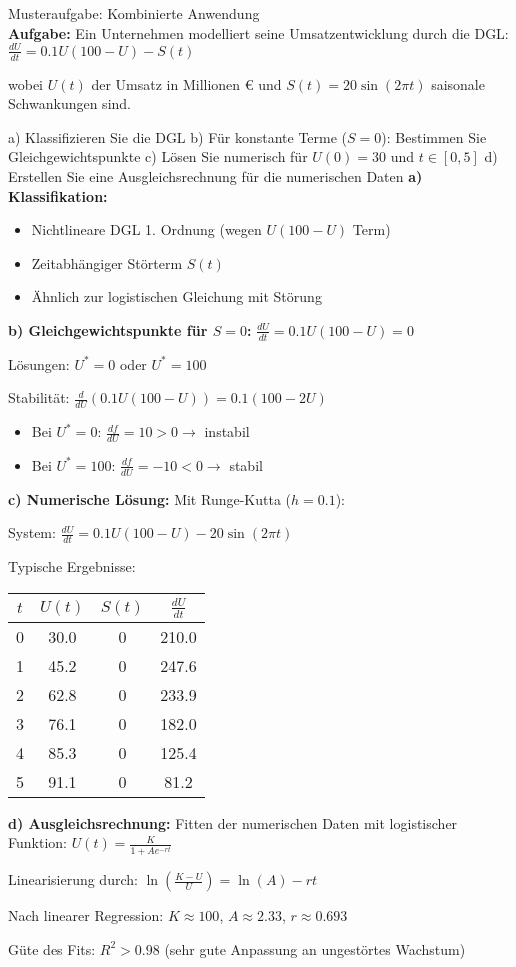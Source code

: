 \begin{example2}{Musteraufgabe: Kombinierte Anwendung}\\
\textbf{Aufgabe:} Ein Unternehmen modelliert seine Umsatzentwicklung durch die DGL:
$\frac{dU}{dt} = 0.1U(100 - U) - S(t)$

wobei $U(t)$ der Umsatz in Millionen € und $S(t) = 20\sin(2\pi t)$ saisonale Schwankungen sind.

a) Klassifizieren Sie die DGL
b) Für konstante Terme ($S = 0$): Bestimmen Sie Gleichgewichtspunkte
c) Lösen Sie numerisch für $U(0) = 30$ und $t \in [0, 5]$
d) Erstellen Sie eine Ausgleichsrechnung für die numerischen Daten
\tcblower
\textbf{a) Klassifikation:}
\begin{itemize}
    \item Nichtlineare DGL 1. Ordnung (wegen $U(100-U)$ Term)
    \item Zeitabhängiger Störterm $S(t)$
    \item Ähnlich zur logistischen Gleichung mit Störung
\end{itemize}

\textbf{b) Gleichgewichtspunkte für $S = 0$:}
$\frac{dU}{dt} = 0.1U(100 - U) = 0$

Lösungen: $U^* = 0$ oder $U^* = 100$

Stabilität:
$\frac{d}{dU}\left(0.1U(100-U)\right) = 0.1(100 - 2U)$

\begin{itemize}
    \item Bei $U^* = 0$: $\frac{df}{dU} = 10 > 0 \rightarrow$ instabil
    \item Bei $U^* = 100$: $\frac{df}{dU} = -10 < 0 \rightarrow$ stabil
\end{itemize}

\textbf{c) Numerische Lösung:}
Mit Runge-Kutta ($h = 0.1$):

System: $\frac{dU}{dt} = 0.1U(100-U) - 20\sin(2\pi t)$

Typische Ergebnisse:
\begin{center}
\begin{tabular}{|c|c|c|c|}
\hline
$t$ & $U(t)$ & $S(t)$ & $\frac{dU}{dt}$ \\
\hline
0 & 30.0 & 0 & 210.0 \\
1 & 45.2 & 0 & 247.6 \\
2 & 62.8 & 0 & 233.9 \\
3 & 76.1 & 0 & 182.0 \\
4 & 85.3 & 0 & 125.4 \\
5 & 91.1 & 0 & 81.2 \\
\hline
\end{tabular}
\end{center}

\textbf{d) Ausgleichsrechnung:}
Fitten der numerischen Daten mit logistischer Funktion:
$U(t) = \frac{K}{1 + Ae^{-rt}}$

Linearisierung durch: $\ln\left(\frac{K-U}{U}\right) = \ln(A) - rt$

Nach linearer Regression: $K \approx 100$, $A \approx 2.33$, $r \approx 0.693$

Güte des Fits: $R^2 > 0.98$ (sehr gute Anpassung an ungestörtes Wachstum)
\end{example2}

